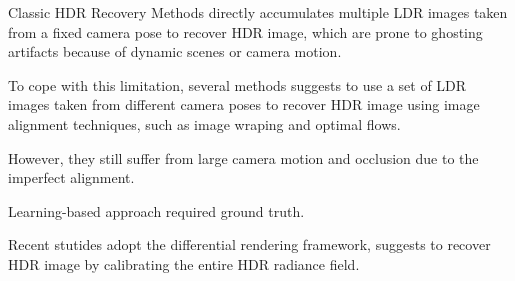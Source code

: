 Classic HDR Recovery Methods directly accumulates 
multiple LDR images taken from a fixed camera pose 
to recover HDR image, which are prone to ghosting artifacts
because of dynamic scenes or camera motion.

To cope with this limitation, several methods suggests
to use a set of LDR images taken from different camera poses
to recover HDR image using image alignment techniques, 
such as image wraping and optimal flows.

However, they still suffer from large camera motion and 
occlusion due to the imperfect alignment.

Learning-based approach required ground truth.

Recent stutides adopt the differential rendering framework, suggests 
to recover HDR image by calibrating the entire HDR radiance field.